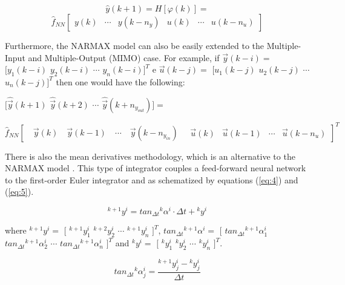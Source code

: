 \documentclass[journal,article,submit,pdftex,moreauthors]{Definitions/mdpi}
\begin{document}
$$ \hat{y}(k+1)=H[\varphi (k)]= $$
\begin{equation}
	\hat{f}_{NN}
	\begin{bmatrix} y(k) & \cdots & y(k-n_y) & u(k) & \cdots & u(k-n_u)
	\end{bmatrix}
	\label{eq:2}
\end{equation}

Furthermore, the NARMAX model can also be easily extended to the Multiple-Input and Multiple-Output (MIMO) case. For example, if $ \vec{y}(k-i)= $ $ [y_1(k-i) $ $ y_2(k-i) $ $ \cdots $ $ y_n(k-i)]^T $ e $ \vec{u}(k-j )= $ $ [u_1(k-j) $ $ u_2(k-j) $ $ \cdots $ $ u_n(k-j)]^T $ then one would have the following:

\begin{center}
	$ [\hat{\vec{y}}(k+1) $ $ \hat{\vec{y}}(k+2) $ $ \cdots $ $ \hat{\vec{y}}(k+n_{y_{out }})]= $
\end{center}
\begin{equation}
	\hat{f}_{NN}[\quad \vec{y}(k) \quad \vec{y}(k-1) \quad \cdots \quad \vec{y}(k-n_{y_{in}}) \quad  
	\begin{matrix}
		\vec{u}(k) & \vec{u}(k-1) & \cdots & \vec{u}(k-n_{u})
	\end{matrix}]^T
	\label{eq:3}
\end{equation}

There is also the mean derivatives methodology, which is an alternative to the NARMAX model \cite{ref7, ref8, ref9}. This type of integrator couples a feed-forward neural network to the first-order Euler integrator and as schematized by equations (\ref{eq:4}) and (\ref{eq:5}).

\begin{equation}
{^{k + 1}y^i} = tan_{\Delta t} {^{k}\alpha^i} \cdot \Delta t + {^{k}y^i}
\label{eq:4}
\end{equation}

\noindent where $ {^{k + 1}y^i}= $ $ [ $ $ {^{k + 1}y_1^i} $ $ {^{k + 2}y_2^i} $ $ \cdots $ $ {^{k + 1}y_n^i} $ $ ]^T $, $ tan_{\Delta t} {^{k + 1} \alpha^i}= $ $ [ $ $ tan_{\Delta t} {^{k + 1} \alpha_1^i} $ $ tan_{\Delta t} {^{k + 1} \alpha_2^i} $ $ \cdots $ $ tan_{\Delta t} {^{k + 1 } \alpha_n^i} $ $ ]^T$ and $ {^{k }y^i}= $ $ [ $ $ {^{k}y_1^i} $ $ {^{k}y_2^i} $ $ \cdots $ $ {^{k}y_n^i} $ $ ]^T $.

\begin{equation}
   tan_{\Delta t} {^{k}\alpha_j^i} = \frac{{^{k+1}y_j^i}-{^{k}y_j^i}}{\Delta t}
\label{eq:5}
\end{equation}
\end{document}
